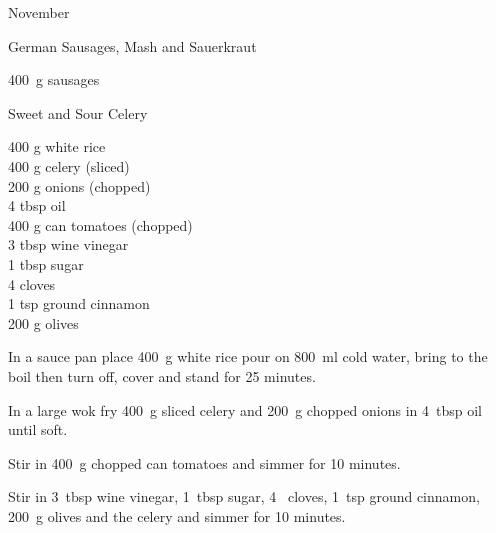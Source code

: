 \begin{menu}{November}
\begin{recipe}{2}{German Sausages, Mash and Sauerkraut}
\begin{ingredients}
		\end{ingredients}
	
    \begin{instructions}
    \item 400~g  sausages
    \end{instructions}
    \end{recipe}%
  
    \begin{recipe}{2}{Sweet and Sour Celery}%
		\begin{ingredients}
		400 g white rice  \\
	400 g celery (sliced) \\
	200 g onions (chopped) \\
	4 tbsp oil  \\
	400 g can tomatoes (chopped) \\
	3 tbsp wine vinegar  \\
	1 tbsp sugar  \\
	4  cloves  \\
	1 tsp ground cinnamon  \\
	200 g olives  \\
	
		\end{ingredients}
	
    \begin{instructions}
    \item 
      In a
      sauce pan
      place
      400~g  white rice
      pour on
      800~ml  cold water,
      bring to the boil then turn off, cover and stand for 25 minutes.
    \item 
        In a large wok fry
        400~g sliced celery
        and
        200~g chopped onions
        in
        4~tbsp  oil
        until soft.
      \item 
        Stir in
        400~g chopped can tomatoes
        and simmer for 10 minutes.
      \item 
        Stir in
        3~tbsp  wine vinegar,
        1~tbsp  sugar,
        4~  cloves,
        1~tsp  ground cinnamon,
        200~g  olives
        and the celery
        and simmer for 10 minutes.
      
    \end{instructions}
    \end{recipe}%
  

\end{menu}

